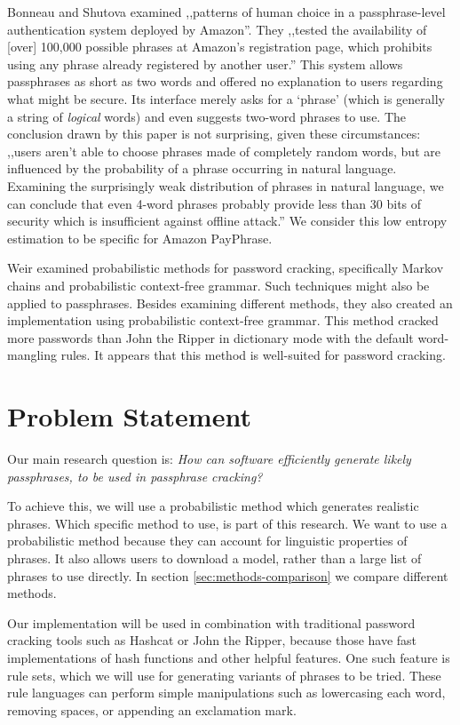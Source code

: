 \documentclass{article}
\begin{document}
Bonneau and Shutova\cite{payphrase-properties} examined ,,patterns of human
choice in a passphrase-level authentication system deployed by Amazon''. They
,,tested the availability of [over] 100,000 possible phrases at Amazon's
registration page, which prohibits using any phrase already registered by
another user.'' This system allows passphrases as short as two words and
offered no explanation to users regarding what might be secure. Its interface
merely asks for a `phrase' (which is generally a string of {\it logical} words)
and even suggests two-word phrases to use. The conclusion drawn by this paper
is not surprising, given these circumstances: ,,users aren't able to choose
phrases made of completely random words, but are influenced by the probability
of a phrase occurring in natural language. Examining the surprisingly weak
distribution of phrases in natural language, we can conclude that even 4-word
phrases probably provide less than 30 bits of security which is insufficient
against offline attack.'' We consider this low entropy estimation to be
specific for Amazon PayPhrase.

Weir\cite{weir} examined probabilistic methods for password cracking,
specifically Markov chains and probabilistic context-free grammar. Such
techniques might also be applied to passphrases. Besides examining different
methods, they also created an implementation using probabilistic context-free
grammar. This method cracked more passwords than John the Ripper in dictionary
mode with the default word-mangling rules. It appears that this method is
well-suited for password cracking.


\section{Problem Statement}\label{sec:problemstatement}

Our main research question is: {\it How can software efficiently generate
likely passphrases, to be used in passphrase cracking?}

To achieve this, we will use a probabilistic method which generates realistic
phrases. Which specific method to use, is part of this research. We want to use
a probabilistic method because they can account for linguistic properties of
phrases. It also allows users to download a model, rather than a large list of
phrases to use directly. In section \ref{sec:methods-comparison} we compare
different methods.

Our implementation will be used in combination with traditional password
cracking tools such as Hashcat or John the Ripper, because those have fast
implementations of hash functions and other helpful features. One such feature
is rule sets, which we will use for generating variants of phrases to be tried.
These rule languages can perform simple manipulations such as lowercasing each
word, removing spaces, or appending an exclamation mark.
\end{document}
